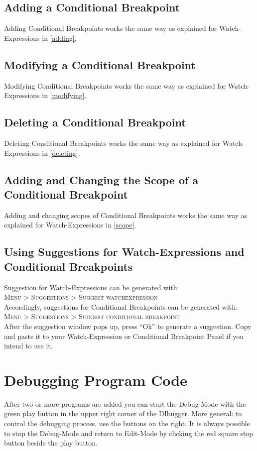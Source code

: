 \documentclass[parskip=full]{memoir}
\begin{document}
\section{Adding a Conditional Breakpoint}
Adding Conditional Breakpoints works the same way as explained for Watch-Expressions in \ref{adding}.
\section{Modifying a Conditional Breakpoint}
Modifying Conditional Breakpoints works the same way as explained for Watch-Expressions in \ref{modifying}.
\section{Deleting a Conditional Breakpoint}
Deleting Conditional Breakpoints works the same way as explained for Watch-Expressions in \ref{deleting}.
\section{Adding and Changing the Scope of a Conditional Breakpoint}
Adding and changing scopes of Conditional Breakpoints works the same way as explained for Watch-Expressions in \ref{scope}.

\section{Using Suggestions for Watch-Expressions and Conditional Breakpoints}
Suggestion for Watch-Expressions can be generated with:\\
\textsc{Menu > Suggestions > Suggest watchexpression}\\

Accordingly, suggestions for Conditional Breakpoints can be generated with:\\
\textsc{Menu > Suggestions > Suggest conditional breakpoint}\\

After the suggestion window pops up, press \enquote{Ok} to generate a suggestion.
Copy and paste it to your Watch-Expression or Conditional Breakpoint Panel if you intend to use it.

\chapter{Debugging Program Code} %
After two or more programs are added you can start the Debug-Mode with the green play button in the upper right corner of the DIbugger. More general: to control the debugging process, use the buttons on the right. It is always possible to stop the Debug-Mode and return to Edit-Mode by clicking the red square stop button beside the play button.
\end{document}
